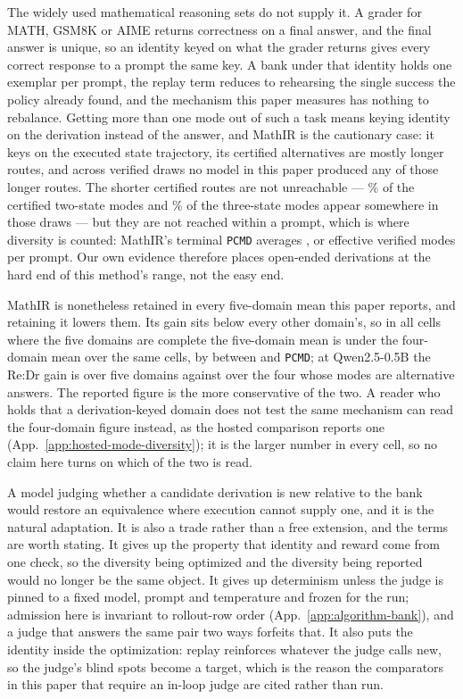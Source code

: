 \documentclass{article}
\newcommand{\1}{\mathbf 1}
\newcommand{\pmd}{\texttt{PCMD}}
\theoremstyle{remark}
\theoremstyle{definition}
\theoremstyle{plain}
\begin{document}
The widely used mathematical reasoning sets do not supply it. A grader for
MATH, GSM8K or AIME returns correctness on a final answer, and the final
answer is unique, so an identity keyed on what the grader returns gives every
correct response to a prompt the same key. A bank under that identity holds
one exemplar per prompt, the replay term reduces to rehearsing the single
success the policy already found, and the mechanism this paper measures has
nothing to rebalance. Getting more than one mode out of such a task means
keying identity on the derivation instead of the answer, and MathIR is the
cautionary case: it keys on the executed state trajectory, its certified
alternatives are mostly longer routes, and across \MIRdraws{} verified draws
no model in this paper produced any of those longer routes. The shorter
certified routes are not unreachable --- \MIRcovershort{}\% of the certified
two-state modes and \MIRcovermid{}\% of the three-state modes appear somewhere
in those draws --- but they are not reached within a prompt, which is where
diversity is counted: MathIR's terminal \pmd{} averages \MIRpmdafter{}, or
\MIRneffafter{} effective verified modes per prompt. Our own evidence therefore places open-ended derivations at the hard end
of this method's range, not the easy end.

MathIR is nonetheless retained in every five-domain mean this paper reports,
and retaining it lowers them. Its gain sits below every other domain's, so in
all \MIRshiftcells{} cells where the five domains are complete the five-domain
mean is under the four-domain mean over the same cells, by between
\MIRshiftmin{} and \MIRshiftmax{} \pmd{}; at Qwen2.5-0.5B the Re:Dr gain is
\MIRfive{} over five domains against \MIRfour{} over the four whose modes are
alternative answers. The reported figure is the more conservative of the two.
A reader who holds that a derivation-keyed domain does not test the same
mechanism can read the four-domain figure instead, as the hosted comparison
reports one (App.~\ref{app:hosted-mode-diversity}); it is the larger number in
every cell, so no claim here turns on which of the two is read.

A model judging whether a candidate derivation is new relative to the bank
would restore an equivalence where execution cannot supply one, and it is the
natural adaptation. It is also a trade rather than a free extension, and the
terms are worth stating. It gives up the property that identity and reward
come from one check, so the diversity being optimized and the diversity being
reported would no longer be the same object. It gives up determinism unless
the judge is pinned to a fixed model, prompt and temperature and frozen for
the run; admission here is invariant to rollout-row order
(App.~\ref{app:algorithm-bank}), and a judge that answers the same pair two
ways forfeits that. It also puts the identity inside the optimization: replay
reinforces whatever the judge calls new, so the judge's blind spots become
a target, which is the reason the comparators in this paper that require an
in-loop judge are cited rather than run.
\end{document}
